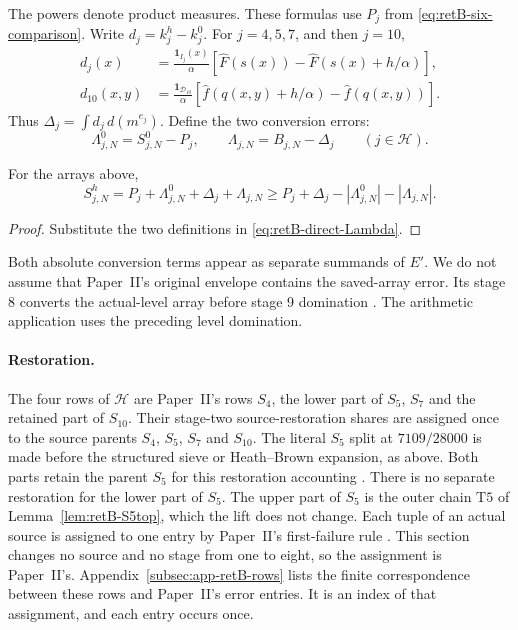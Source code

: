 The powers denote product measures.
These formulas use $P_j$ from \eqref{eq:retB-six-comparison}.
Write $d_j=k_j^h-k_j^0$. For $j=4,5,7$, and then $j=10$,
\begin{equation}\label{eq:retB-direct-kernels}
\begin{aligned}
 d_j(x)&=\frac{\mathbf1_{I_j}(x)}{\alpha}
  [\widehat F(s(x))-\widehat F(s(x)+h/\alpha)],\\
 d_{10}(x,y)&=\frac{\mathbf1_{\mathcal D_{10}}}{\alpha}
  [\widehat f(q(x,y)+h/\alpha)-\widehat f(q(x,y))].
\end{aligned}
\end{equation}
Thus $\Delta_j=\int d_j\,d(m^{e_j})$.
Define the two conversion errors:
\begin{equation}\label{eq:retB-direct-Lambda}
 \Lambda^0_{j,N}=S^0_{j,N}-P_j,\qquad
 \Lambda_{j,N}=B_{j,N}-\Delta_j\qquad(j\in\mathcal H).
\end{equation}

\begin{lemma}\label{lem:retB-finite-profile}
For the arrays above,
\begin{equation}\label{eq:retB-H6-use}
 S_{j,N}^h=P_j+\Lambda^0_{j,N}+\Delta_j+\Lambda_{j,N}
 \ge P_j+\Delta_j-|\Lambda^0_{j,N}|-|\Lambda_{j,N}|.
\end{equation}
\end{lemma}
\begin{proof}
Substitute the two definitions in \eqref{eq:retB-direct-Lambda}.
\end{proof}
Both absolute conversion terms appear as separate summands of $E'$.
We do not assume that Paper~II's original envelope contains the
saved-array error. Its stage 8 converts the actual-level array before
stage 9 domination \cite[\S6.1, stage table]{PaperII}.
The arithmetic application uses the preceding level domination.

\paragraph{Restoration.}
The four rows of $\mathcal H$ are Paper~II's rows $S_4$, the lower part
of $S_5$, $S_7$ and the retained part of $S_{10}$. Their stage-two
source-restoration shares are assigned once to the source parents $S_4$,
$S_5$, $S_7$ and $S_{10}$. The literal $S_5$ split at $7109/28000$
is made before the structured sieve or Heath--Brown expansion, as above.
Both parts retain the parent $S_5$ for this restoration accounting
\cite[(2.28), \S6.1, stage table and the list of S10, S5 and S4/S7 endpoints]{PaperII}.
There is no separate restoration for the lower part of $S_5$. The upper part
of $S_5$ is the outer chain $\mathrm{T5}$ of Lemma~\ref{lem:retB-S5top},
which the lift does not change. Each tuple of an actual source is assigned
to one entry by Paper~II's first-failure rule \cite[(6.4d) and the two
sentences after it]{PaperII}. This section changes no source and no stage
from one to eight, so the assignment is Paper~II's. Appendix~\ref{subsec:app-retB-rows} lists the finite
correspondence between these rows and Paper~II's error entries. It is an index of that
assignment, and each entry occurs once.

